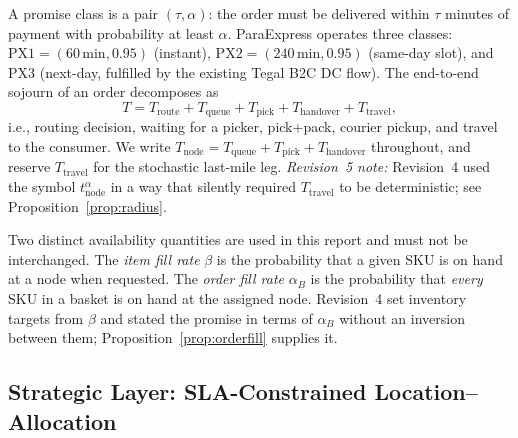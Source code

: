 \begin{definition}
A promise class is a pair $(\tau,\alpha)$: the order must be delivered within $\tau$ minutes of payment with probability at least $\alpha$. ParaExpress operates three classes: $\mathrm{PX1}=(60\,\mathrm{min},0.95)$ (instant), $\mathrm{PX2}=(240\,\mathrm{min},0.95)$ (same-day slot), and $\mathrm{PX3}$ (next-day, fulfilled by the existing Tegal B2C DC flow). The end-to-end sojourn of an order decomposes as
\begin{equation}\label{eq:sojourn}
T=T_{\mathrm{route}}+T_{\mathrm{queue}}+T_{\mathrm{pick}}+T_{\mathrm{handover}}+T_{\mathrm{travel}},
\end{equation}
i.e., routing decision, waiting for a picker, pick+pack, courier pickup, and travel to the consumer. We write $T_{\mathrm{node}}=T_{\mathrm{queue}}+T_{\mathrm{pick}}+T_{\mathrm{handover}}$ throughout, and reserve $T_{\mathrm{travel}}$ for the stochastic last-mile leg. \emph{Revision~5 note:} Revision~4 used the symbol $t^{\alpha}_{\mathrm{node}}$ in a way that silently required $T_{\mathrm{travel}}$ to be deterministic; see Proposition~\ref{prop:radius}.
\end{definition}

\begin{definition}[Availability]\label{def:avail}
Two distinct availability quantities are used in this report and must not be interchanged. The \emph{item fill rate} $\beta$ is the probability that a given SKU is on hand at a node when requested. The \emph{order fill rate} $\alpha_B$ is the probability that \emph{every} SKU in a basket is on hand at the assigned node. Revision~4 set inventory targets from $\beta$ and stated the promise in terms of $\alpha_B$ without an inversion between them; Proposition~\ref{prop:orderfill} supplies it.
\end{definition}

\subsection{Strategic Layer: SLA-Constrained Location--Allocation}


